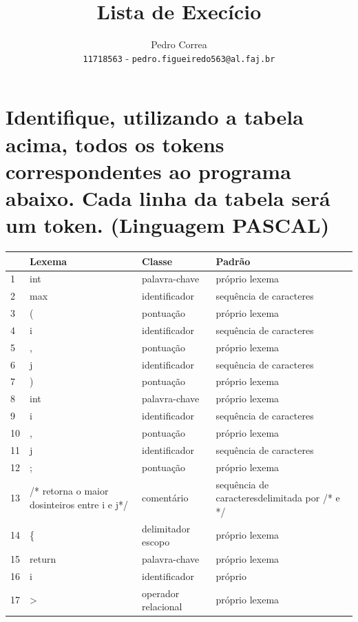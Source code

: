 \documentclass{article}
\author{
  Pedro Correa\\
  \texttt{11718563} - \texttt{pedro.figueiredo563@al.faj.br}
}
\title{Lista de Execício}
\begin{document}
\maketitle

\newpage

\section{Identifique, utilizando a tabela acima, todos os tokens correspondentes ao programa abaixo. Cada linha da tabela será um token. (Linguagem PASCAL)}

\begin{center}
  \begin{tabular}{||p{0.7cm} p{3cm} p{3cm} p{3cm}||}
     \hline
     & Lexema & Classe & Padrão \\ [0.5ex]
     \hline\hline
     1 & int & palavra-chave & próprio lexema \\
     \hline
     2 & max & identificador & sequência de caracteres \\
     \hline
     3 & ( & pontuação & próprio lexema \\
     \hline
     4 & i & identificador & sequência de caracteres \\
     \hline
     5 & , & pontuação & próprio lexema \\
     \hline
     6 & j & identificador & sequência de caracteres \\
     \hline
     7 & ) & pontuação & próprio lexema \\
     \hline
     8 & int & palavra-chave & próprio lexema \\
     \hline
     9 & i & identificador & sequência de caracteres \\
     \hline
     10 & , & pontuação & próprio lexema \\
     \hline
     11 & j & identificador & sequência de caracteres \\
     \hline
     12 & ; & pontuação & próprio lexema \\
     \hline
     13 & /* retorna o maior dosinteiros entre i e j*/ & comentário & sequência de caracteresdelimitada por /* e */ \\
     \hline
     14 & \{ & delimitador escopo & próprio lexema \\
     \hline
     15 & return & palavra-chave & próprio lexema \\
     \hline
     16 & i & identificador & próprio \\
     \hline
     17 & > & operador relacional & próprio lexema \\

\end{tabular}
\end{center}
\end{document}
